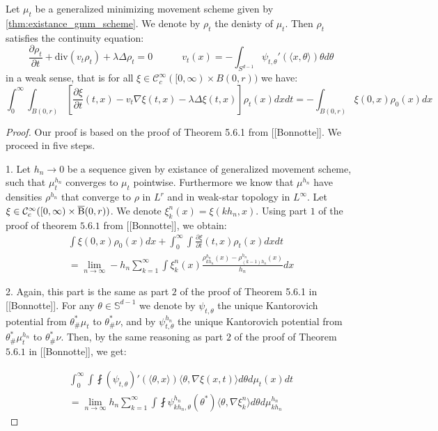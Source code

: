 \begin{thm}
Let $\mu_t$ be a generalized minimizing movement scheme given by \ref{thm:existance_gmm_scheme}. We denote by $\rho_t$ the denisty of $\mu_t$. Then $\rho_t$ satisfies the continuity equation:
\[
\frac{\partial \rho_t}{\partial t} + \text{div}(v_t \rho_t) + \lambda \Delta \rho_t = 0  \quad \quad \quad v_t(x) = - \int_{S^{d-1}} \psi_{t, \theta}'(\langle x , \theta \rangle ) \theta d\theta 
\]
in a weak sense, that is for all $\xi \in \mathcal{C}_c^{\infty} ([0, \infty)\times B(0,r))$ we have:
\[
\int_0^{\infty} \int_{B(0,r)} \left[\frac{\partial \xi}{\partial t}(t,x) - v_t \nabla \xi(t,x)  - \lambda \Delta \xi(t,x)\right] \rho_t(x) dx dt = -\int_{B(0,r)} \xi(0,x)\rho_0(x) dx
\]
\end{thm}
\begin{proof}
Our proof is based on the proof of Theorem 5.6.1 from [[Bonnotte]]. We proceed in five steps.

1. Let $h_n \rightarrow 0$ be a sequence given by existance of generalized movement scheme, such that $\mu_t^{h_n}$ converges to $\mu_t$ pointwise. Furthermore we know that $\mu^{h_n}$ have densities $\rho^{h_n}$ that converge to $\rho$ in $L^r$ and in weak-star topology in $L^{\infty}$. Let $\xi \in \mathcal{C}_c^{\infty} ([0, \infty) \times \operatorname{\overline{B}}(0,r))$. We denote $\xi_{k}^n(x)  = \xi(kh_n, x)$. Using part $1$ of the proof of theorem $5.6.1$ from [[Bonnotte]], we obtain:
\begin{multline} \label{thm:cont_proof_part1}
\int \xi(0, x) \rho_0(x) dx + \int_0^{\infty} \int \frac{\partial \xi}{\partial t}(t,x) \rho_t(x) dx dt \\
= \lim_{n \rightarrow \infty} - h_n \sum_{k=1}^{\infty} \int \xi_k^n(x) \frac{\rho_{kh_n}^{h_n}(x) - \rho_{(k-1)h_n}^{h_n}(x) }{h_n} dx
\end{multline}

2. Again, this part is the same as part $2$ of the proof of Theorem 5.6.1 in [[Bonnotte]]. For any $\theta \in \mathbb{S}^{d-1}$ we denote by $\psi_{t, \theta}$ the unique Kantorovich potential from $\theta_{\#}^{*}\mu_t$ to $\theta_{\#}^{*}\nu$, and by $\psi_{t, \theta}^{h_n}$ the unique Kantorovich potential from $\theta_{\#}^{*} \mu_t^{h_n}$ to $\theta_{\#}^{*} \nu$. Then, by the same reasoning as part $2$ of the proof of Theorem $5.6.1$ in [[Bonnotte]], we get:

\begin{multline} \label{thm:cont_proof_part2}
\int_0^{\infty} \int \fint (\psi_{t, \theta})' (\langle \theta, x \rangle ) \langle \theta , \nabla \xi (x, t) \rangle d\theta d\mu_t(x) dt \\
= \lim_{n \rightarrow \infty} h_n \sum_{k=1}^{\infty} \int \fint \psi_{kh_n, \theta}^{h_n} (\theta^{*}) \langle \theta, \nabla \xi_{k}^n \rangle d \theta d\mu_{kh_n}^{h_n}
\end{multline}


\end{proof}
